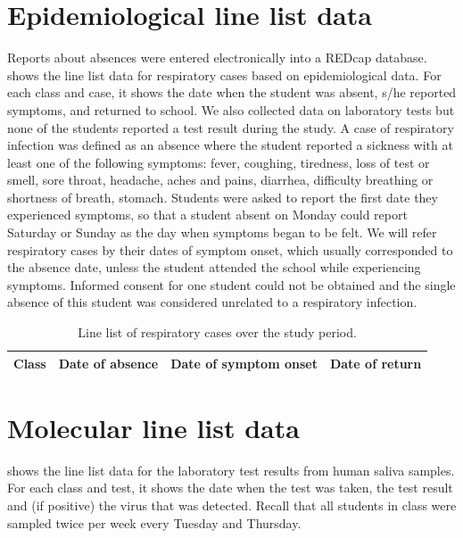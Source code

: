 \documentclass[fleqn,11pt]{wlscirep_supp}
\begin{document}
\clearpage

\section{Epidemiological line list data}\label{sec:case-data}

Reports about absences were entered electronically into a REDcap database\cite{Harris2009,Harris2019}.  shows the line list data for respiratory cases based on epidemiological data. For each class and case, it shows the date when the student was absent, s/he reported symptoms, and returned to school. We also collected data on laboratory tests but none of the students reported a test result during the study. A case of respiratory infection was defined as an absence where the student reported a sickness with at least one of the following symptoms: fever, coughing, tiredness, loss of test or smell, sore throat, headache, aches and pains, diarrhea, difficulty breathing or shortness of breath, stomach. Students were asked to report the first date they experienced symptoms, so that a student absent on Monday could report Saturday or Sunday as the day when symptoms began to be felt. We will refer respiratory cases by their dates of symptom onset, which usually corresponded to the absence date, unless the student attended the school while experiencing symptoms. Informed consent for one student could not be obtained and the single absence of this student was considered unrelated to a respiratory infection. 

{\footnotesize\begin{longtable}{l l l l}
    \caption[Line list of respiratory cases over the study period]{Line list of respiratory cases over the study period.}\label{tab:epi-data-line-list} \\
    \toprule
    Class & Date of absence & Date of symptom onset & Date of return \\
    \midrule
    
    \bottomrule
\end{longtable}}

\clearpage

\section{Molecular line list data}\label{sec:mol-data}

 shows the line list data for the laboratory test results from human saliva samples. For each class and test, it shows the date when the test was taken, the test result and (if positive) the virus that was detected. Recall that all students in class were sampled twice per week every Tuesday and Thursday. 
\end{document}

